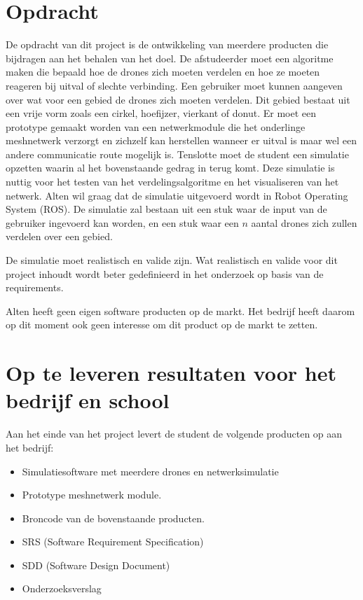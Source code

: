 \documentclass[a4paper, 11pt, oneside]{report}
\begin{document}
\section{Opdracht}
De opdracht van dit project is de ontwikkeling van meerdere producten die bijdragen aan het behalen van het doel. 
De afstudeerder moet een algoritme maken die bepaald hoe de drones zich moeten verdelen en hoe ze moeten reageren bij uitval of slechte verbinding.
Een gebruiker moet kunnen aangeven over wat voor een gebied de drones zich moeten verdelen.
Dit gebied bestaat uit een vrije vorm zoals een cirkel, hoefijzer, vierkant of donut.
Er moet een prototype gemaakt worden van een netwerkmodule die het onderlinge meshnetwerk verzorgt en zichzelf kan herstellen wanneer er uitval is maar wel een andere communicatie route mogelijk is. 
Tenslotte moet de student een simulatie opzetten waarin al het bovenstaande gedrag in terug komt. 
Deze simulatie is nuttig voor het testen van het verdelingsalgoritme en het visualiseren van het netwerk.
Alten wil graag dat de simulatie uitgevoerd wordt in Robot Operating System (ROS). 
De simulatie zal bestaan uit een stuk waar de input van de gebruiker ingevoerd kan worden, en een stuk waar een $n$ aantal drones zich zullen verdelen over een gebied.

De simulatie moet realistisch en valide zijn.
Wat realistisch en valide voor dit project inhoudt wordt beter gedefinieerd in het onderzoek op basis van de requirements. 

Alten heeft geen eigen software producten op de markt.
Het bedrijf heeft daarom op dit moment ook geen interesse om dit product op de markt te zetten.

\section{Op te leveren resultaten voor het bedrijf en school}

Aan het einde van het project levert de student de volgende producten op aan het bedrijf:

\begin{itemize}
\item Simulatiesoftware met meerdere drones en netwerksimulatie
\item Prototype meshnetwerk module.
\item Broncode van de bovenstaande producten. 
\item SRS (Software Requirement Specification)
\item SDD (Software Design Document)
\item Onderzoeksverslag
\end{itemize}
\end{document}
